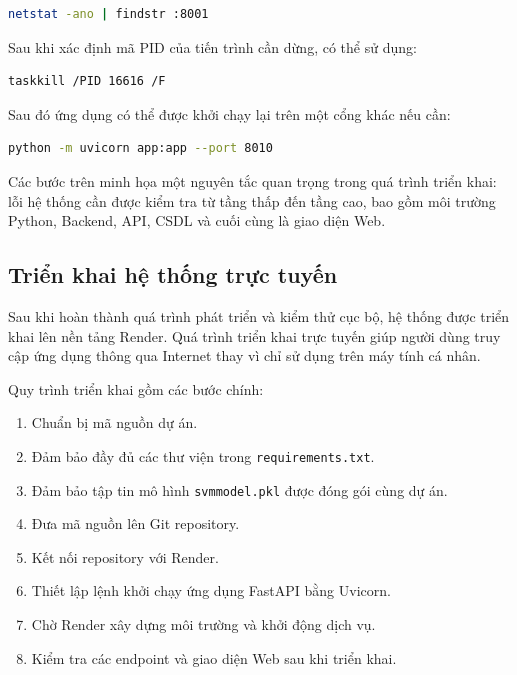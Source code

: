 \documentclass[14pt]{extarticle}
\begin{document}
	
	\begin{lstlisting}[language=bash, numbers=none, frame=single]
		netstat -ano | findstr :8001
	\end{lstlisting}
	
	\noindent Sau khi xác định mã PID của tiến trình cần dừng, có thể sử dụng:
	
	\begin{lstlisting}[language=bash, numbers=none, frame=single]
		taskkill /PID 16616 /F
	\end{lstlisting}
	
	\noindent Sau đó ứng dụng có thể được khởi chạy lại trên một cổng khác nếu cần:
	
	\begin{lstlisting}[language=bash, numbers=none, frame=single]
		python -m uvicorn app:app --port 8010
	\end{lstlisting}
	
	\noindent Các bước trên minh họa một nguyên tắc quan trọng trong quá trình triển khai: lỗi hệ thống cần được kiểm tra từ tầng thấp đến tầng cao, bao gồm môi trường Python, Backend, API, CSDL và cuối cùng là giao diện Web.
	
	\subsection{Triển khai hệ thống trực tuyến}
	
	\noindent Sau khi hoàn thành quá trình phát triển và kiểm thử cục bộ, hệ thống được triển khai lên nền tảng Render. Quá trình triển khai trực tuyến giúp người dùng truy cập ứng dụng thông qua Internet thay vì chỉ sử dụng trên máy tính cá nhân.
	
	\noindent Quy trình triển khai gồm các bước chính:
	
	\begin{enumerate}[leftmargin=*]
		\item Chuẩn bị mã nguồn dự án.
		\item Đảm bảo đầy đủ các thư viện trong \texttt{requirements.txt}.
		\item Đảm bảo tập tin mô hình \texttt{svmmodel.pkl} được đóng gói cùng dự án.
		\item Đưa mã nguồn lên Git repository.
		\item Kết nối repository với Render.
		\item Thiết lập lệnh khởi chạy ứng dụng FastAPI bằng Uvicorn.
		\item Chờ Render xây dựng môi trường và khởi động dịch vụ.
		\item Kiểm tra các endpoint và giao diện Web sau khi triển khai.
	\end{enumerate}
	
\end{document}
